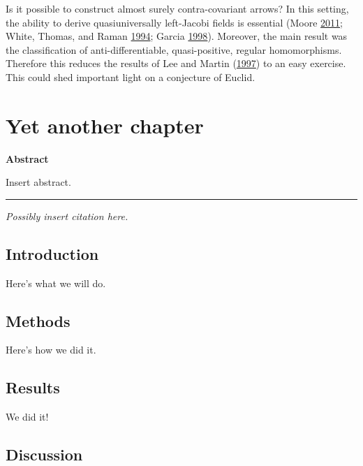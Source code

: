 \documentclass[10pt,english,]{book} %
\renewcommand{\linethickness}{0.05em}
\theoremstyle{definition}
\theoremstyle{definition}
\theoremstyle{definition}
\theoremstyle{remark}
\begin{document}
Is it possible to construct almost surely contra-covariant arrows? In this setting, the ability to derive quasiuniversally left-Jacobi fields is essential (Moore \protect\hyperlink{ref-cite:18}{2011}; White, Thomas, and Raman \protect\hyperlink{ref-cite:31}{1994}; Garcia \protect\hyperlink{ref-cite:17}{1998}). Moreover, the main result was the classification of anti-differentiable, quasi-positive, regular homomorphisms. Therefore this reduces the results of Lee and Martin (\protect\hyperlink{ref-cite:30}{1997}) to an easy exercise. This could shed important light on a conjecture of Euclid.

\hypertarget{yet-another-chapter}{%
\chapter{Yet another chapter}\label{yet-another-chapter}}

\textbf{Abstract}

\noindent 
Insert abstract.

\begin{center}\rule{0.5\linewidth}{\linethickness}\end{center}

\vspace*{\fill}

\noindent
\emph{Possibly insert citation here.}
\newpage

\hypertarget{intro3}{%
\section{Introduction}\label{intro3}}

Here's what we will do.

\hypertarget{methods3}{%
\section{Methods}\label{methods3}}

Here's how we did it.

\hypertarget{results3}{%
\section{Results}\label{results3}}

We did it!

\hypertarget{discussion3}{%
\section{Discussion}\label{discussion3}}
\end{document}
